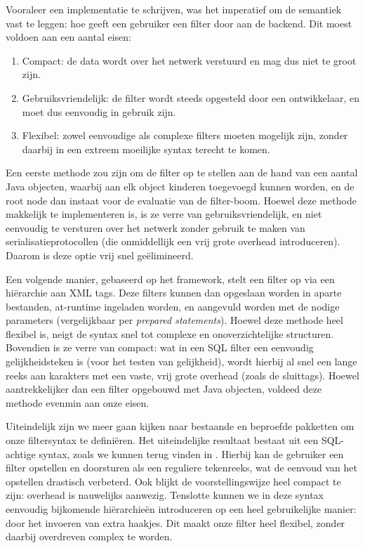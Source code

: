 Vooraleer een implementatie te schrijven, was het imperatief om de semantiek vast te leggen: hoe geeft een gebruiker een filter door aan de backend. Dit moest voldoen aan een aantal eisen:
\begin{enumerate}
\item Compact: de data wordt over het netwerk verstuurd en mag dus niet te groot zijn.
\item Gebruiksvriendelijk: de filter wordt steeds opgesteld door een ontwikkelaar, en moet dus eenvoudig in gebruik zijn.
\item Flexibel: zowel eenvoudige als complexe filters moeten mogelijk zijn, zonder daarbij in een extreem moeilijke syntax terecht te komen.
\end{enumerate}

Een eerste methode zou zijn om de filter op te stellen aan de hand van een aantal Java objecten, waarbij aan elk object kinderen toegevoegd kunnen worden, en de root node dan instaat voor de evaluatie van de filter-boom. Hoewel deze methode makkelijk te implementeren is, is ze verre van gebruiksvriendelijk, en niet eenvoudig te versturen over het netwerk zonder gebruik te maken van serialisatieprotocollen (die onmiddellijk een vrij grote overhead introduceren). Daarom is deze optie vrij snel ge\"elimineerd.

Een volgende manier, gebaseerd op het  framework, stelt een filter op via een hi\"erarchie aan XML tags. Deze filters kunnen dan opgeslaan worden in aparte bestanden, at-runtime ingeladen worden, en aangevuld worden met de nodige parameters (vergelijkbaar per \emph{prepared statements}). Hoewel deze methode heel flexibel is, neigt de syntax snel tot complexe en onoverzichtelijke structuren. Bovendien is ze verre van compact: wat in een SQL filter een eenvoudig gelijkheidsteken is (voor het testen van gelijkheid), wordt hierbij al snel een lange reeks aan karakters met een vaste, vrij grote overhead (zoals de sluittags). Hoewel aantrekkelijker dan een filter opgebouwd met Java objecten, voldeed deze methode evenmin aan onze eisen.

Uiteindelijk zijn we meer gaan kijken naar bestaande en beproefde pakketten om onze filtersyntax te defini\"eren. Het uiteindelijke resultaat bestaat uit een SQL-achtige syntax, zoals we kunnen terug vinden in . Hierbij kan de gebruiker een filter opstellen en doorsturen als een reguliere tekenreeks, wat de eenvoud van het opstellen drastisch verbeterd. Ook blijkt de voorstellingswijze heel compact te zijn: overhead is nauwelijks aanwezig. Tenslotte kunnen we in deze syntax eenvoudig bijkomende hi\"erarchie\"en introduceren op een heel gebruikelijke manier: door het invoeren van extra haakjes. Dit maakt onze filter heel flexibel, zonder daarbij overdreven complex te worden.

